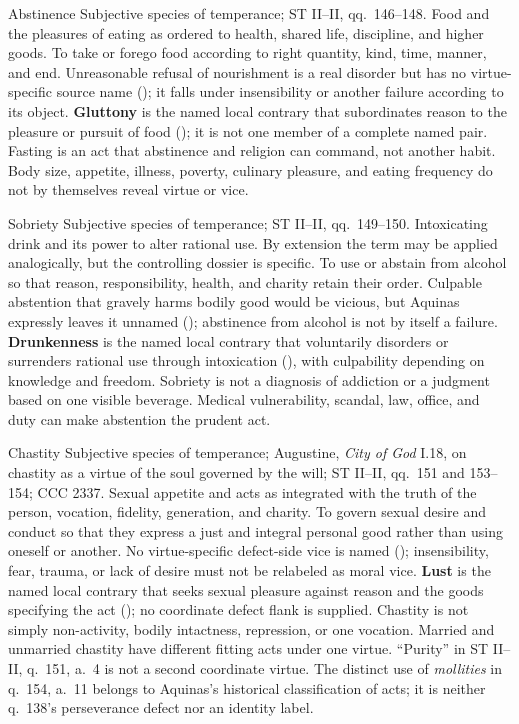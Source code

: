 
\virtuedossier
  {Abstinence}
  {Subjective species of temperance; ST II--II, qq.~146--148.}
  {Food and the pleasures of eating as ordered to health, shared life, discipline, and higher goods.}
  {To take or forego food according to right quantity, kind, time, manner, and end.}
  {Unreasonable refusal of nourishment is a real disorder but has no virtue-specific source name (); it falls under insensibility or another failure according to its object.}
  {\textbf{Gluttony} is the named local contrary that subordinates reason to the pleasure or pursuit of food (); it is not one member of a complete named pair.}
  {Fasting is an act that abstinence and religion can command, not another habit. Body size, appetite, illness, poverty, culinary pleasure, and eating frequency do not by themselves reveal virtue or vice.}

\virtuedossier
  {Sobriety}
  {Subjective species of temperance; ST II--II, qq.~149--150.}
  {Intoxicating drink and its power to alter rational use. By extension the term may be applied analogically, but the controlling dossier is specific.}
  {To use or abstain from alcohol so that reason, responsibility, health, and charity retain their order.}
  {Culpable abstention that gravely harms bodily good would be vicious, but Aquinas expressly leaves it unnamed (); abstinence from alcohol is not by itself a failure.}
  {\textbf{Drunkenness} is the named local contrary that voluntarily disorders or surrenders rational use through intoxication (), with culpability depending on knowledge and freedom.}
  {Sobriety is not a diagnosis of addiction or a judgment based on one visible beverage. Medical vulnerability, scandal, law, office, and duty can make abstention the prudent act.}

\virtuedossier
  {Chastity}
  {Subjective species of temperance; Augustine, \emph{City of God} I.18, on chastity as a virtue of the soul governed by the will; ST II--II, qq.~151 and 153--154; CCC 2337.}
  {Sexual appetite and acts as integrated with the truth of the person, vocation, fidelity, generation, and charity.}
  {To govern sexual desire and conduct so that they express a just and integral personal good rather than using oneself or another.}
  {No virtue-specific defect-side vice is named (); insensibility, fear, trauma, or lack of desire must not be relabeled as moral vice.}
  {\textbf{Lust} is the named local contrary that seeks sexual pleasure against reason and the goods specifying the act (); no coordinate defect flank is supplied.}
  {Chastity is not simply non-activity, bodily intactness, repression, or one vocation. Married and unmarried chastity have different fitting acts under one virtue. ``Purity'' in ST II--II, q.~151, a.~4 is not a second coordinate virtue. The distinct use of \emph{mollities} in q.~154, a.~11 belongs to Aquinas's historical classification of acts; it is neither q.~138's perseverance defect nor an identity label.}

